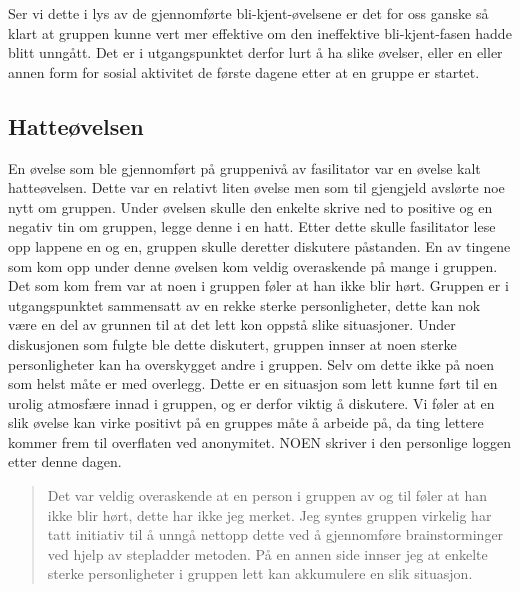 Ser vi dette i lys av de gjennomførte bli-kjent-øvelsene er det for oss ganske så klart at gruppen kunne vert mer effektive om den ineffektive bli-kjent-fasen hadde blitt unngått. 
Det er i utgangspunktet derfor lurt å ha slike øvelser, eller en eller annen form for sosial aktivitet de første dagene etter at en gruppe er startet. 

\subsection{Hatteøvelsen}
En øvelse som ble gjennomført på gruppenivå av fasilitator var en øvelse kalt hatteøvelsen. 
Dette var en relativt liten øvelse men som til gjengjeld avslørte noe nytt om gruppen. 
Under øvelsen skulle den enkelte skrive ned to positive og en negativ tin om gruppen, legge denne i en hatt. 
Etter dette skulle fasilitator lese opp lappene en og en, gruppen skulle deretter diskutere påstanden. 
En av tingene som kom opp under denne øvelsen kom veldig overaskende på mange i gruppen. 
Det som kom frem var at noen i gruppen føler at han ikke blir hørt. 
Gruppen er i utgangspunktet sammensatt av en rekke sterke personligheter, 
dette kan nok være en del av grunnen til at det lett kon oppstå slike situasjoner. 
Under diskusjonen som fulgte ble dette diskutert, gruppen innser at noen sterke personligheter kan ha overskygget andre i gruppen. 
Selv om dette ikke på noen som helst måte er med overlegg. 
Dette er en situasjon som lett kunne ført til en urolig atmosfære innad i gruppen, og er derfor viktig å diskutere. 
Vi føler at en slik øvelse kan virke positivt på en gruppes måte å arbeide på, da ting lettere kommer frem til overflaten ved anonymitet. 
NOEN skriver i den personlige loggen etter denne dagen.
\begin{quote}
Det var veldig overaskende at en person i gruppen av og til føler at han ikke blir hørt, dette har ikke jeg merket. 
Jeg syntes gruppen virkelig har tatt initiativ til å unngå nettopp dette ved å gjennomføre brainstorminger ved hjelp av stepladder metoden. 
På en annen side innser jeg at enkelte sterke personligheter i gruppen lett kan akkumulere en slik situasjon. 
\end{quote}
